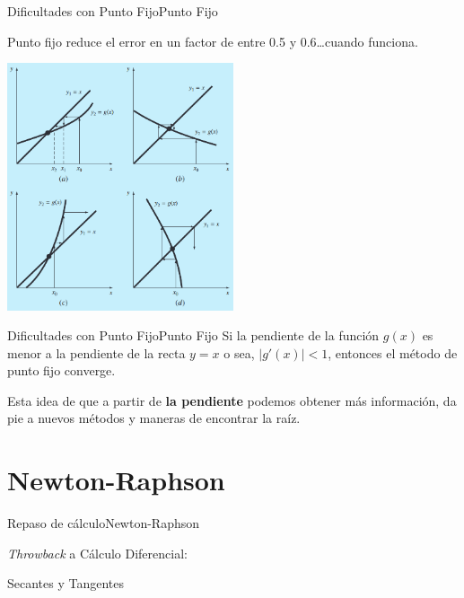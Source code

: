 \documentclass[spanish, c]{beamer}
\begin{document}
\begin{frame}{Dificultades con Punto Fijo}{Punto Fijo}

    Punto fijo reduce el error en un factor de entre 0.5 y 0.6\dots cuando funciona.

    \begin{center}
        \includegraphics[width=0.5\textwidth]{fp_convergence.png}
    \end{center} 

\end{frame}

\begin{frame}{Dificultades con Punto Fijo}{Punto Fijo}
Si la pendiente de la función $g(x)$ es menor a la pendiente de la recta $y=x$ o sea, $|g'(x)| < 1$, entonces el método de punto fijo \alert{converge}.

\bigskip

Esta idea de que a partir de \textbf{la pendiente} podemos obtener más información, da pie a nuevos métodos y maneras de encontrar la raíz.
\end{frame}

\section{Newton-Raphson}

\begin{frame}{Repaso de cálculo}{Newton-Raphson}

    \begin{center}
        {\huge
        \textit{Throwback} a Cálculo Diferencial:}

        Secantes y Tangentes
    \end{center}

\end{frame}
\end{document}

